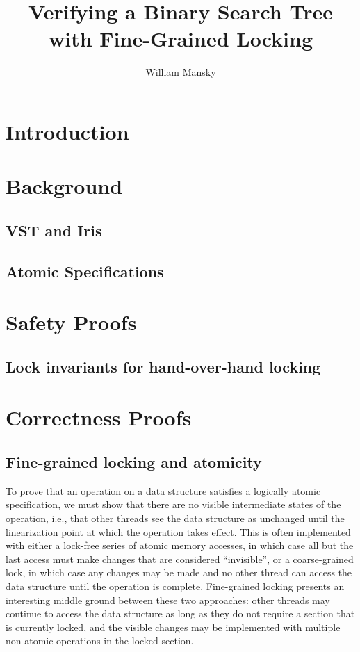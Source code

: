 \documentclass[11pt]{article} %
\title{Verifying a Binary Search Tree with Fine-Grained Locking }
\author{William Mansky}
\date{} %
\begin{document}
\maketitle

\section{Introduction}

\section{Background}
\subsection{VST and Iris}
\subsection{Atomic Specifications}

\section{Safety Proofs}
\subsection{Lock invariants for hand-over-hand locking}

\section{Correctness Proofs}
\subsection{Fine-grained locking and atomicity}

To prove that an operation on a data structure satisfies a logically atomic specification, we must show that there are no visible intermediate states of the operation, i.e., that other threads see the data structure as unchanged until the linearization point at which the operation takes effect. This is often implemented with either a lock-free series of atomic memory accesses, in which case all but the last access must make changes that are considered ``invisible'', or a coarse-grained lock, in which case any changes may be made and no other thread can access the data structure until the operation is complete. Fine-grained locking presents an interesting middle ground between these two approaches: other threads may continue to access the data structure as long as they do not require a section that is currently locked, and the visible changes may be implemented with multiple non-atomic operations in the locked section.
\end{document}
